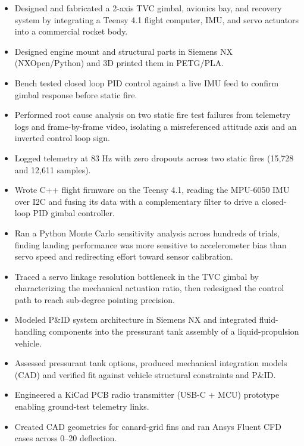 \begin{itemize}
  \item Designed and fabricated a 2-axis TVC gimbal, avionics bay, and recovery system by integrating a Teensy 4.1 flight computer, IMU, and servo actuators into a commercial rocket body.
  \item Designed engine mount and structural parts in Siemens NX (NXOpen/Python) and 3D printed them in PETG/PLA.
  \item Bench tested closed loop PID control against a live IMU feed to confirm gimbal response before static fire.
  \item Performed root cause analysis on two static fire test failures from telemetry logs and frame-by-frame video, isolating a misreferenced attitude axis and an inverted control loop sign.
  \item Logged telemetry at 83 Hz with zero dropouts across two static fires (15,728 and 12,611 samples).
  \item Wrote C++ flight firmware on the Teensy 4.1, reading the MPU-6050 IMU over I2C and fusing its data with a complementary filter to drive a closed-loop PID gimbal controller.
  \item Ran a Python Monte Carlo sensitivity analysis across hundreds of trials, finding landing performance was more sensitive to accelerometer bias than servo speed and redirecting effort toward sensor calibration.
  \item Traced a servo linkage resolution bottleneck in the TVC gimbal by characterizing the mechanical actuation ratio, then redesigned the control path to reach sub-degree pointing precision.
\end{itemize}
\entrygap

\begin{itemize}
  \item Modeled P\&ID system architecture in Siemens NX and integrated fluid-handling components into the pressurant tank assembly of a liquid-propulsion vehicle.
  \item Assessed pressurant tank options, produced mechanical integration models (CAD) and verified fit against vehicle structural constraints and P\&ID.
  \item Engineered a KiCad PCB radio transmitter (USB-C + MCU) prototype enabling ground-test telemetry links.
  \item Created CAD geometries for canard-grid fins and ran Ansys Fluent CFD cases across 0--20\textdegree{} deflection.
\end{itemize}
\entrygap

